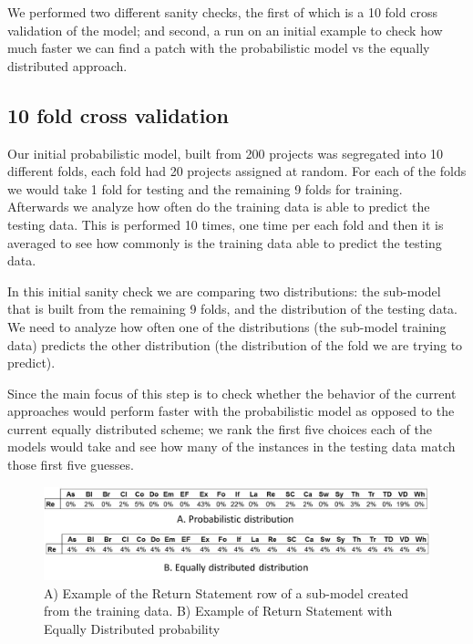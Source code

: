 \documentclass[conference]{IEEEtran}
\begin{document}
We performed two different sanity checks, the first of which is a 10 fold cross 
validation of the model; and second, a run on an initial example to check how 
much faster we can find a patch with the probabilistic model vs the equally 
distributed approach.

\subsection{10 fold cross validation}

Our initial probabilistic model, built from 200 projects was segregated into 10 
different folds, each fold had 20 projects assigned at random. For each of the 
folds we would take 1 fold for testing and the remaining 9 folds for training. 
Afterwards we analyze how often do the training data is able to predict the 
testing data. This is performed 10 times, one time per each fold and then it is 
averaged to see how commonly is the training data able to predict the testing 
data.

In this initial sanity check we are comparing two distributions: the sub-model 
that is built from the remaining 9 folds, and the distribution of the testing 
data. We need to analyze how often one of the distributions (the sub-model 
training data) predicts the other distribution (the distribution of the fold we 
are trying to predict). 

Since the main focus of this step is to check whether the behavior of the 
current approaches would perform faster with the probabilistic model as opposed 
to the current equally distributed scheme; we rank the first five choices each 
of the models would take and see how many of the instances in the testing data 
match those first five guesses.

\begin{figure}[!h]
  \centering
    \includegraphics[scale=0.25]{sanity5}
  \caption{A) Example of the Return Statement row of a sub-model created from 
the 
training data. B) Example of Return Statement with Equally Distributed 
probability}
  \label{fig:exPredReturn}
\end{figure}
\end{document}
